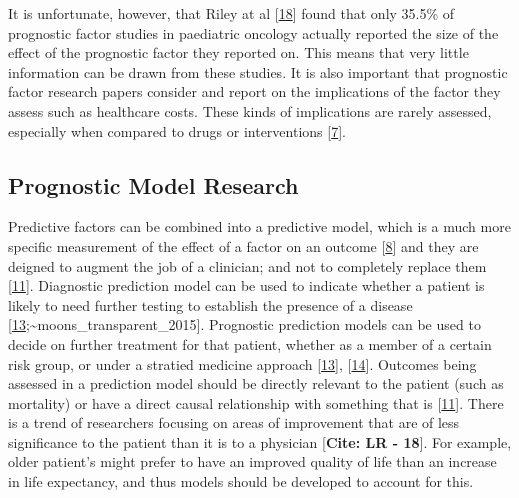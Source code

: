 \documentclass[
]{article}
\begin{document}
It is unfortunate, however, that Riley at al {[}\protect\hyperlink{ref-riley_systematic_2003-1}{18}{]} found that only 35.5\% of prognostic factor studies in paediatric oncology actually reported the size of the effect of the prognostic factor they reported on. This means that very little information can be drawn from these studies. It is also important that prognostic factor research papers consider and report on the implications of the factor they assess such as healthcare costs. These kinds of implications are rarely assessed, especially when compared to drugs or interventions {[}\protect\hyperlink{ref-riley_prognosis_2013}{7}{]}.

\hypertarget{prognostic-model-research}{%
\subsection{Prognostic Model Research}\label{prognostic-model-research}}

Predictive factors can be combined into a predictive model, which is a much more specific measurement of the effect of a factor on an outcome {[}\protect\hyperlink{ref-steyerberg_prognosis_2013}{8}{]} and they are deigned to augment the job of a clinician; and not to completely replace them {[}\protect\hyperlink{ref-moons_prognosis_2009}{11}{]}. Diagnostic prediction model can be used to indicate whether a patient is likely to need further testing to establish the presence of a disease {[}\protect\hyperlink{ref-collins_transparent_2015}{13};\textasciitilde moons\_transparent\_2015{]}. Prognostic prediction models can be used to decide on further treatment for that patient, whether as a member of a certain risk group, or under a stratied medicine approach {[}\protect\hyperlink{ref-collins_transparent_2015}{13}{]}, {[}\protect\hyperlink{ref-moons_transparent_2015}{14}{]}. Outcomes being assessed in a prediction model should be directly relevant to the patient (such as mortality) or have a direct causal relationship with something that is {[}\protect\hyperlink{ref-moons_prognosis_2009}{11}{]}. There is a trend of researchers focusing on areas of improvement that are of less significance to the patient than it is to a physician {[}\textbf{Cite: LR - 18}{]}. For example, older patient's might prefer to have an improved quality of life than an increase in life expectancy, and thus models should be developed to account for this.
\end{document}

